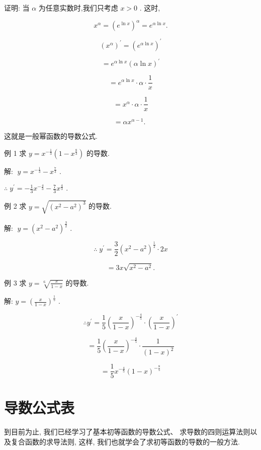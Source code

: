 \documentclass[lang=cn,newtx,12pt,scheme=chinese]{elegantbook}
\begin{document}
证明: 当 \(\alpha\) 为任意实数时,我们只考虑 \(x > 0\) . 这时,

\[
{x}^{\alpha } = {\left( {e}^{\ln x}\right) }^{\alpha } = {e}^{\alpha \ln x}.
\]

\[
{\left( {x}^{\alpha }\right) }^{\prime } = {\left( {e}^{\alpha \ln x}\right) }^{\prime }
\]

\[
= {e}^{\alpha \ln x}{\left( \alpha \ln x\right) }^{\prime }
\]

\[
= {e}^{\alpha \ln x} \cdot \alpha \cdot \frac{1}{x}
\]

\[
= {x}^{\alpha } \cdot \alpha \cdot \frac{1}{x}
\]

\[
= \alpha {x}^{\alpha - 1}\text{. }
\]

这就是一般幂函数的导数公式.

例 1 求 \(y = {x}^{-\frac{1}{3}}\left( {1 - {x}^{\frac{8}{3}}}\right)\) 的导数.

解: \(\;y = {x}^{-\frac{1}{3}} - {x}^{\frac{7}{3}}\) .

\(\therefore \;{y}^{\prime } = - \frac{1}{3}{x}^{-\frac{4}{3}} - \frac{7}{3}{x}^{\frac{4}{3}}\) .

例 2 求 \(y = \sqrt{{\left( {x}^{2} - {a}^{2}\right) }^{3}}\) 的导数.

解: \(\;y = {\left( {x}^{2} - {a}^{2}\right) }^{\frac{3}{2}}\) .

\[
\therefore \;{y}^{\prime } = \frac{3}{2}{\left( {x}^{2} - {a}^{2}\right) }^{\frac{1}{2}} \cdot {2x}
\]

\[
= {3x}\sqrt{{x}^{2} - {a}^{2}}\text{.}
\]

例 3 求 \(y = \sqrt[6]{\frac{x}{1 - x}}\) 的导数.

解: \(y = {\left( \frac{x}{1 - x}\right) }^{\frac{1}{5}}\) .

\[
\therefore {y}^{\prime } = \frac{1}{5}{\left( \frac{x}{1 - x}\right) }^{-\frac{4}{5}} \cdot {\left( \frac{x}{1 - x}\right) }^{\prime }
\]

\[
= \frac{1}{5}{\left( \frac{x}{1 - x}\right) }^{-\frac{4}{5}} \cdot \frac{1}{{\left( 1 - x\right) }^{2}}
\]

\[
= \frac{1}{5}{x}^{-\frac{4}{5}}{\left( 1 - x\right) }^{-\frac{8}{5}}
\]

\section*{导数公式表}

到目前为止, 我们已经学习了基本初等函数的导数公式、 求导数的四则运算法则以及复合函数的求导法则, 这样, 我们也就学会了求初等函数的导数的一般方法.
\end{document}
